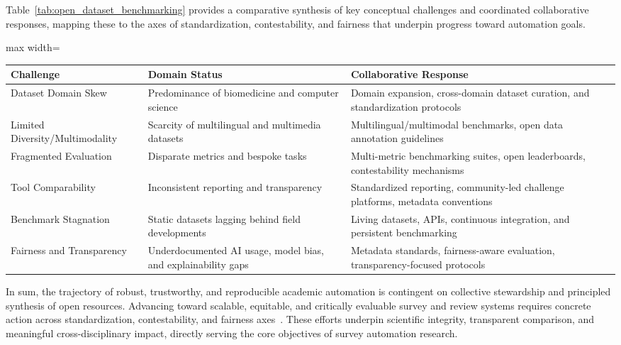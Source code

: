 \documentclass[sigconf]{acmart}
\begin{document}
Table~\ref{tab:open_dataset_benchmarking} provides a comparative synthesis of key conceptual challenges and coordinated collaborative responses, mapping these to the axes of standardization, contestability, and fairness that underpin progress toward automation goals.

\begin{table*}[htbp]
\centering
\caption{Key Challenges and Collaborative Responses in Open Datasets and Benchmarking}
\label{tab:open_dataset_benchmarking}
\begin{adjustbox}{max width=\textwidth}
\begin{tabular}{@{}llll@{}}
\toprule
\textbf{Challenge} & \textbf{Domain Status} & \textbf{Collaborative Response} &  \\ 
\midrule
Dataset Domain Skew & Predominance of biomedicine and computer science & Domain expansion, cross-domain dataset curation, and standardization protocols &  \\
Limited Diversity/Multimodality & Scarcity of multilingual and multimedia datasets & Multilingual/multimodal benchmarks, open data annotation guidelines &  \\
Fragmented Evaluation & Disparate metrics and bespoke tasks & Multi-metric benchmarking suites, open leaderboards, contestability mechanisms &  \\
Tool Comparability & Inconsistent reporting and transparency & Standardized reporting, community-led challenge platforms, metadata conventions &  \\
Benchmark Stagnation & Static datasets lagging behind field developments & Living datasets, APIs, continuous integration, and persistent benchmarking &  \\
Fairness and Transparency & Underdocumented AI usage, model bias, and explainability gaps & Metadata standards, fairness-aware evaluation, transparency-focused protocols &  \\
\bottomrule
\end{tabular}
\end{adjustbox}
\end{table*}

In sum, the trajectory of robust, trustworthy, and reproducible academic automation is contingent on collective stewardship and principled synthesis of open resources. Advancing toward scalable, equitable, and critically evaluable survey and review systems requires concrete action across standardization, contestability, and fairness axes~\cite{ref26,ref27,ref31,ref32,ref33,ref34,ref35,ref68,ref78,ref80,ref84,ref98,ref100,ref102,ref104,ref106}. These efforts underpin scientific integrity, transparent comparison, and meaningful cross-disciplinary impact, directly serving the core objectives of survey automation research.
\end{document}
